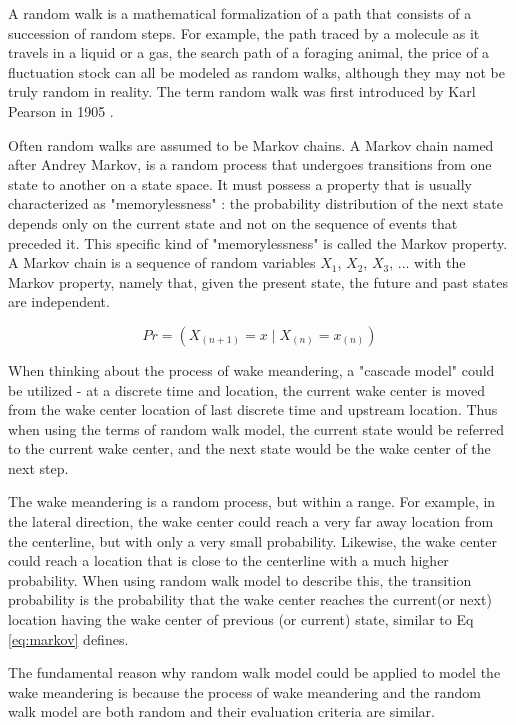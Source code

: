 \documentclass{umthesis}
\begin{document}
A random walk is a mathematical formalization of a path that consists of a succession of random steps. For example, the path traced by a molecule as it travels in a liquid or a gas, the search path of a foraging animal, the price of a fluctuation stock can all be modeled as random walks, although they may not be truly random in reality. The term random walk was first introduced by Karl Pearson in 1905 \cite{Pearson}.

Often random walks are assumed to be Markov chains. A Markov chain named after Andrey Markov, is a random process that undergoes transitions from one state to another on a state space. It must possess a property that is usually characterized as "memorylessness" \cite{JamesR}: the probability distribution of the next state depends only on the current state and not on the sequence of events that preceded it. This specific kind of "memorylessness" is called the Markov property. A Markov chain is a sequence of random variables $X_1$, $X_2$, $X_3$, ... with the Markov property, namely that, given the present state, the future and past states are independent. 

\begin{equation}\label{eq:markov}
 Pr=(X_{(n+1)} = x \mid X_{(n)}=x_{(n)})
\end{equation}

When thinking about the process of wake meandering, a "cascade model" could be utilized - at a discrete time and location, the current wake center is moved from the wake center location of last discrete time and upstream location. Thus when using the terms of random walk model, the current state would be referred to the current wake center, and the next state would be the wake center of the next step.

The wake meandering is a random process, but within a range. For example, in the lateral direction, the wake center could reach a very far away location from the centerline, but with only a very small probability. Likewise, the wake center could reach a location that is close to the centerline with a much higher probability. When using random walk model to describe this, the transition probability is the probability that the wake center reaches the current(or next) location having the wake center of previous (or current) state, similar to Eq \ref{eq:markov} defines. 
  
The fundamental reason why random walk model could be applied to model the wake meandering is because the process of wake meandering and the random walk model are both random and their evaluation criteria are similar. 
\end{document}
